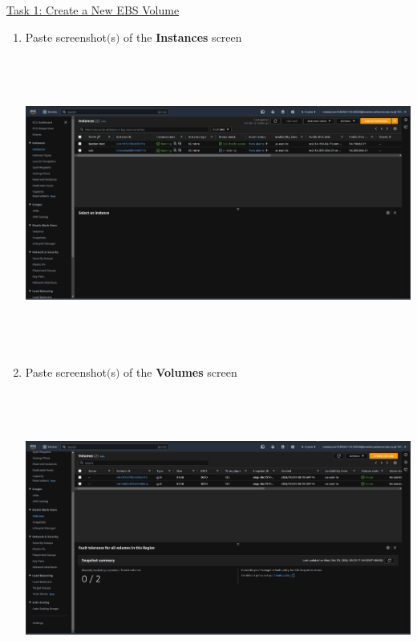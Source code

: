 \documentclass[11pt]{article}
\begin{document}
\vspace{1.5cm}

\newpage

\noindent\underline{Task 1: Create a New EBS Volume}

\begin{enumerate}
    \item Paste screenshot$($s$)$ of the \textbf{Instances} screen\\

    \vspace{5mm}
    
    
    {\centering
    \includegraphics[width=6.1in, height=3.8in]{pics/1.png}
    }
    
    \item Paste screenshot$($s$)$ of the \textbf{Volumes} screen \\

    \vspace{5mm}

    {\centering
    \includegraphics[width=6.1in, height=3.8in]{pics/2.png}
    }


\end{enumerate}
\end{document}
